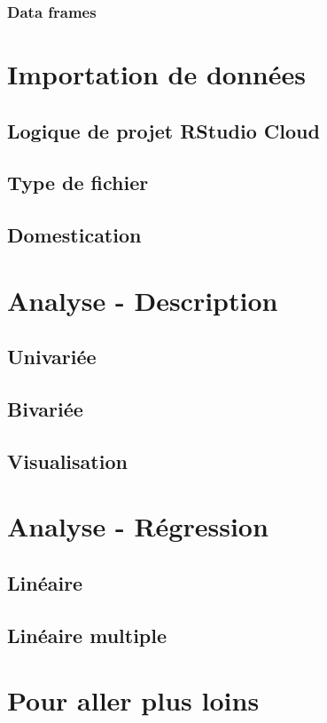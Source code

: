 \documentclass[10.5pt,a4paper]{article}
\begin{document}
    \subsubsection{Data frames}
  
\section{Importation de données}
  \subsection{Logique de projet RStudio Cloud}
  \subsection{Type de fichier}
  \subsection{Domestication}

  
\section{Analyse - Description}
  \subsection{Univariée}
  \subsection{Bivariée}
  \subsection{Visualisation}


\section{Analyse - Régression}
  \subsection{Linéaire}
  \subsection{Linéaire multiple}

  
\section{Pour aller plus loins}
 
%
%
\end{document}
